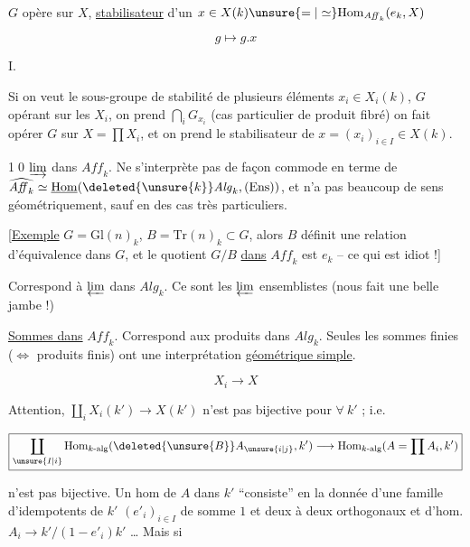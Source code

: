 
$G$ opère sur $X$, \uline{stabilisateur} d'un $x\in X(k)\unsure{=|\simeq}\mathrm{Hom}_{\mathit{Aff}_k}(e_k,X)$

\[
g\longmapsto g.x
\]


$\mathrm I$.

Si on veut le sous-groupe de stabilité de plusieurs éléments $x_i\in X_i(k)$, $G$ opérant sur les $X_i$, on prend $\bigcap_i G_{x_i}$ (cas particulier de produit fibré)  on fait opérer $G$ sur $X=\prod X_i$, et on prend le stabilisateur de $x=(x_i)_{i\in I}\in X(k)$.

\textcircled{10} $\varinjlim$ dans $\mathit{Aff}_k$. Ne s'interprète pas de façon commode en terme de $\widehat{\mathit{Aff}_k}\simeq\underline{\mathrm{Hom}}(\deleted{\unsure{k}}\mathit{Alg}_k,(\mathrm{Ens}))$, et n'a pas beaucoup de sens géométriquement, sauf en des cas très particuliers.

[\uline{Exemple} $G=\mathrm{Gl}(n)_k$, $B=\mathrm{Tr}(n)_k\subset G$, alors  $B$ définit une relation d'équivalence dans $G$, et le quotient $G/B$ \uline{dans} $\mathit{Aff}_k$ est $e_k$ -- ce qui est idiot !]


Correspond à $\varprojlim$ dans $\mathit{Alg}_k$. Ce sont les $\varprojlim$ ensemblistes (nous fait une belle jambe !)

 \uline{Sommes dans} $\mathit{Aff}_k$. Correspond aux produits dans $\mathit{Alg}_k$. Seules les sommes finies ($\Longleftrightarrow$ produits finis) ont une interprétation \uline{géométrique simple}.

\[
X_i\longrightarrow X
\]

Attention, $\boxed{\coprod_i X_i(k')\to X(k')}$ n'est pas bijective pour $\forall\ k'$ ;  i.e.

\[
\boxed{\coprod_{\unsure{I|i}}\mathrm{Hom}_{k\text{-}\mathrm{alg}}(\deleted{\unsure{B}}A_{\unsure{i|j}},k')\longrightarrow
\mathrm{Hom}_{k\text{-}\mathrm{alg}}(A=\prod A_i,k')}
\]

n'est pas bijective.  Un hom de $A$ dans $k'$ ``consiste'' en la donnée d'une famille d'idempotents de $k'$ $(e'_i)_{i\in I}$ de somme $1$ et deux à deux orthogonaux et d'hom. $A_i\to k'/(1-e'_i)k'$ \ldots{} Mais si

